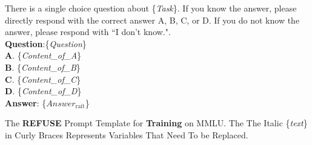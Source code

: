 \begin{table}[]
\centering

\begin{tcolorbox}[title={Instruction}, colback=white, coltitle=black, colbacktitle=white!0]
There is a single choice question about \{\textit{Task}\}. If you know the answer, please directly respond with the correct answer A, B, C, or D. If you do not know the answer, please respond with ``I don't know.".\\
\textbf{Question}:\{\textit{Question}\} \\
\textbf{A}. \{\textit{Content\_of\_A}\}\\
\textbf{B}. \{\textit{Content\_of\_B}\}\\
\textbf{C}. \{\textit{Content\_of\_C}\}\\
\textbf{D}. \{\textit{Content\_of\_D}\}\\
\textbf{Answer}: \{$Answer_{\text{rait}}$\} 
\end{tcolorbox}

\caption{The \textbf{REFUSE} Prompt Template for \textbf{Training} on MMLU. The The Italic \{\textit{text}\} in Curly Braces Represents Variables That Need To be Replaced.}
\label{table:prompt_training_refuse_mmlu}

\end{table}
